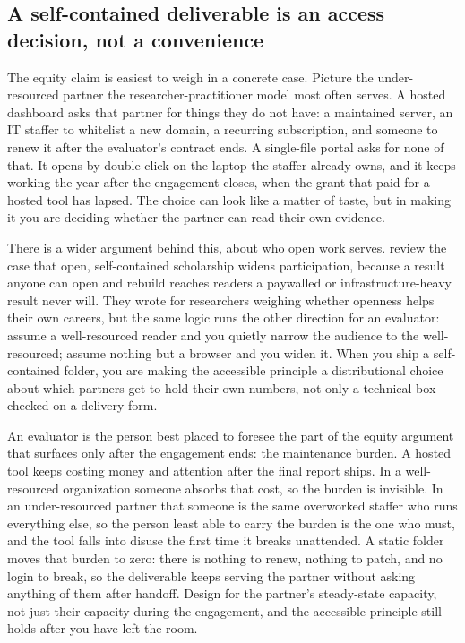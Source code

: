 \documentclass[
    a4paper,
    fontsize=10pt,
    twoside=true,
    numbers=noenddot,
]{kaobook}
\begin{document}
\subsection{A self-contained deliverable is an access decision, not a convenience}
The equity claim is easiest to weigh in a concrete case. Picture the under-resourced partner the researcher-practitioner model most often serves. A hosted dashboard asks that partner for things they do not have: a maintained server, an IT staffer to whitelist a new domain, a recurring subscription, and someone to renew it after the evaluator's contract ends. A single-file portal asks for none of that. It opens by double-click on the laptop the staffer already owns, and it keeps working the year after the engagement closes, when the grant that paid for a hosted tool has lapsed. The choice can look like a matter of taste, but in making it you are deciding whether the partner can read their own evidence.

There is a wider argument behind this, about who open work serves. \textcite{mckiernan2016open} review the case that open, self-contained scholarship widens participation, because a result anyone can open and rebuild reaches readers a paywalled or infrastructure-heavy result never will. They wrote for researchers weighing whether openness helps their own careers, but the same logic runs the other direction for an evaluator: assume a well-resourced reader and you quietly narrow the audience to the well-resourced; assume nothing but a browser and you widen it. When you ship a self-contained folder, you are making the accessible principle a distributional choice about which partners get to hold their own numbers, not only a technical box checked on a delivery form.

An evaluator is the person best placed to foresee the part of the equity argument that surfaces only after the engagement ends: the maintenance burden. A hosted tool keeps costing money and attention after the final report ships. In a well-resourced organization someone absorbs that cost, so the burden is invisible. In an under-resourced partner that someone is the same overworked staffer who runs everything else, so the person least able to carry the burden is the one who must, and the tool falls into disuse the first time it breaks unattended. A static folder moves that burden to zero: there is nothing to renew, nothing to patch, and no login to break, so the deliverable keeps serving the partner without asking anything of them after handoff. Design for the partner's steady-state capacity, not just their capacity during the engagement, and the accessible principle still holds after you have left the room.
\end{document}
